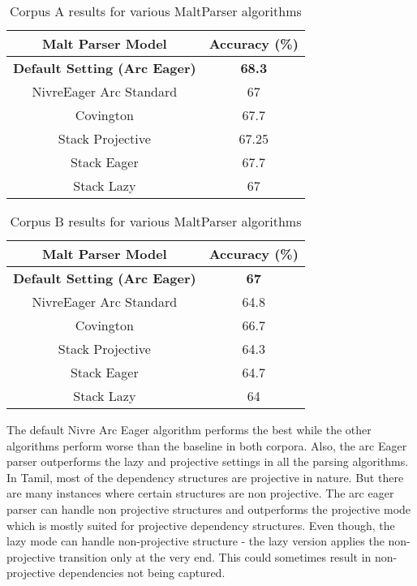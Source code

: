 \documentclass[11pt,letterpaper]{article}
\begin{document}
\begin{table}
\begin{center}
  \begin{tabular}{ c || c }
  \hline
  Malt Parser Model & Accuracy (\%)\\
  \hline
  \textbf{Default Setting (Arc Eager)} & \textbf{68.3} \\
  NivreEager Arc Standard & 67 \\  
  Covington & 67.7 \\
  Stack Projective & 67.25 \\
  Stack Eager & 67.7 \\
  Stack Lazy & 67 \\
  \hline
   \end{tabular}
\end{center}
\caption{Corpus A results for various MaltParser algorithms}
\label{First}
\end{table}

\begin{table}
\begin{center}
  \begin{tabular}{ c || c }
  \hline
  Malt Parser Model & Accuracy (\%)\\
  \hline
  \textbf{Default Setting (Arc Eager)} & \textbf{67} \\
  NivreEager Arc Standard & 64.8 \\  
  Covington & 66.7 \\
  Stack Projective & 64.3 \\
  Stack Eager & 64.7 \\
  Stack Lazy & 64 \\
  \hline
   \end{tabular}
\end{center}
\caption{Corpus B results for various MaltParser algorithms}
\label{First}
\end{table}

The default Nivre Arc Eager algorithm performs the best while the other algorithms perform worse than the baseline in both corpora. Also, the arc Eager
parser outperforms the lazy and projective settings in all the parsing algorithms. In Tamil, most of the dependency structures are projective in nature.
But there are many instances where certain structures are non projective. The arc eager parser can handle non projective structures and outperforms
the projective mode which is mostly suited for projective dependency structures. Even though, the lazy mode can handle non-projective structure - the lazy version
applies the non-projective transition only at the very end. This could sometimes result in non-projective dependencies not being captured.
\end{document}
